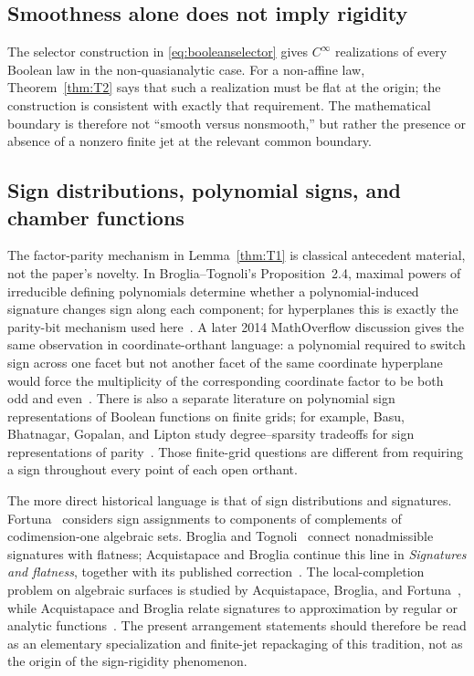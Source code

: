 \documentclass[11pt]{article}
\theoremstyle{definition}
\theoremstyle{remark}
\begin{document}
\subsection{Smoothness alone does not imply rigidity}

The selector construction in \eqref{eq:booleanselector} gives $C^\infty$ realizations of every Boolean law in the non-quasianalytic case. For a non-affine law, Theorem~\ref{thm:T2} says that such a realization must be flat at the origin; the construction is consistent with exactly that requirement. The mathematical boundary is therefore not ``smooth versus nonsmooth,'' but rather the presence or absence of a nonzero finite jet at the relevant common boundary.

\subsection{Sign distributions, polynomial signs, and chamber functions}

The factor-parity mechanism in Lemma~\ref{thm:T1} is classical antecedent material, not the paper's novelty. In Broglia--Tognoli's Proposition~2.4, maximal powers of irreducible defining polynomials determine whether a polynomial-induced signature changes sign along each component; for hyperplanes this is exactly the parity-bit mechanism used here~\cite[Proposition~2.4]{BrogliaTognoli1989}. A later 2014 MathOverflow discussion gives the same observation in coordinate-orthant language: a polynomial required to switch sign across one facet but not another facet of the same coordinate hyperplane would force the multiplicity of the corresponding coordinate factor to be both odd and even~\cite{MathOverflow2014}. There is also a separate literature on polynomial sign representations of Boolean functions on finite grids; for example, Basu, Bhatnagar, Gopalan, and Lipton study degree--sparsity tradeoffs for sign representations of parity~\cite{BasuEtAl2008}. Those finite-grid questions are different from requiring a sign throughout every point of each open orthant.

The more direct historical language is that of sign distributions and signatures. Fortuna~\cite{Fortuna1991} considers sign assignments to components of complements of codimension-one algebraic sets. Broglia and Tognoli~\cite{BrogliaTognoli1989} connect nonadmissible signatures with flatness; Acquistapace and Broglia continue this line in \emph{Signatures and flatness}, together with its published correction~\cite{AcquistapaceBroglia1992,AcquistapaceBroglia1993Correction}. The local-completion problem on algebraic surfaces is studied by Acquistapace, Broglia, and Fortuna~\cite{AcquistapaceBrogliaFortuna1994}, while Acquistapace and Broglia relate signatures to approximation by regular or analytic functions~\cite{AcquistapaceBroglia1994}. The present arrangement statements should therefore be read as an elementary specialization and finite-jet repackaging of this tradition, not as the origin of the sign-rigidity phenomenon.
\end{document}
